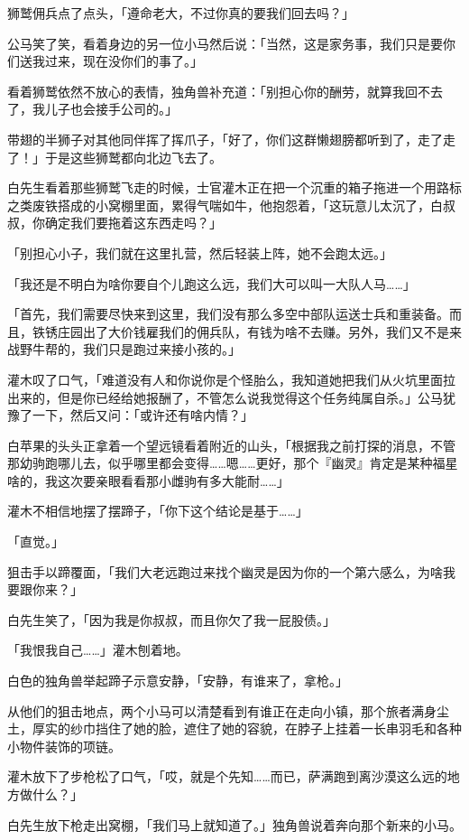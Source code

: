 狮鹫佣兵点了点头，「遵命老大，不过你真的要我们回去吗？」

公马笑了笑，看着身边的另一位小马然后说：「当然，这是家务事，我们只是要你们送我过来，现在没你们的事了。」

看着狮鹫依然不放心的表情，独角兽补充道：「别担心你的酬劳，就算我回不去了，我儿子也会接手公司的。」

带翅的半狮子对其他同伴挥了挥爪子，「好了，你们这群懒翅膀都听到了，走了走了！」于是这些狮鹫都向北边飞去了。

白先生看着那些狮鹫飞走的时候，士官灌木正在把一个沉重的箱子拖进一个用路标之类废铁搭成的小窝棚里面，累得气喘如牛，他抱怨着，「这玩意儿太沉了，白叔叔，你确定我们要拖着这东西走吗？」

「别担心小子，我们就在这里扎营，然后轻装上阵，她不会跑太远。」

「我还是不明白为啥你要自个儿跑这么远，我们大可以叫一大队人马……」

「首先，我们需要尽快来到这里，我们没有那么多空中部队运送士兵和重装备。而且，铁锈庄园出了大价钱雇我们的佣兵队，有钱为啥不去赚。另外，我们又不是来战野牛帮的，我们只是跑过来接小孩的。」

灌木叹了口气，「难道没有人和你说你是个怪胎么，我知道她把我们从火坑里面拉出来的，但是你已经给她报酬了，不管怎么说我觉得这个任务纯属自杀。」公马犹豫了一下，然后又问：「或许还有啥内情？」

白苹果的头头正拿着一个望远镜看着附近的山头，「根据我之前打探的消息，不管那幼驹跑哪儿去，似乎哪里都会变得……嗯……更好，那个『幽灵』肯定是某种福星啥的，我这次要亲眼看看那小雌驹有多大能耐……」

灌木不相信地摆了摆蹄子，「你下这个结论是基于……」

「直觉。」

狙击手以蹄覆面，「我们大老远跑过来找个幽灵是因为你的一个第六感么，为啥我要跟你来？」

白先生笑了，「因为我是你叔叔，而且你欠了我一屁股债。」

「我恨我自己……」灌木刨着地。

白色的独角兽举起蹄子示意安静，「安静，有谁来了，拿枪。」

从他们的狙击地点，两个小马可以清楚看到有谁正在走向小镇，那个旅者满身尘土，厚实的纱巾挡住了她的脸，遮住了她的容貌，在脖子上挂着一长串羽毛和各种小物件装饰的项链。

灌木放下了步枪松了口气，「哎，就是个先知……而已，萨满跑到离沙漠这么远的地方做什么？」

白先生放下枪走出窝棚，「我们马上就知道了。」独角兽说着奔向那个新来的小马。

